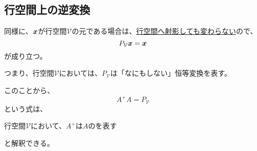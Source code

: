 \documentclass[../../../topic_linear-algebra]{subfiles}
\begin{document}
\subsection{行空間上の逆変換}

同様に、$\vb*{x}$が行空間$\mathcal{V}$の元である場合は、\hyperref[sec:projection-onto-subspace]{行空間へ射影しても変わらない}ので、
\begin{equation*}
  P_{\mathcal{V}} \vb*{x} = \vb*{x}
\end{equation*}
が成り立つ。

つまり、行空間$\mathcal{V}$においては、$P_{\mathcal{V}}$は「なにもしない」恒等変換を表す。

\br

このことから、
\begin{equation*}
  A^+ A = P_{\mathcal{V}}
\end{equation*}
という式は、
\begin{emphabox}
  \begin{spacebox}
    \begin{center}
      行空間$\mathcal{V}$において、$A^+$は$A$のを表す
    \end{center}
  \end{spacebox}
\end{emphabox}
と解釈できる。
\end{document}
